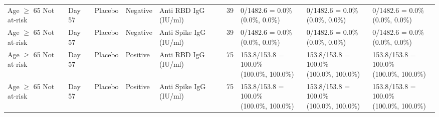 \documentclass[]{book}
\theoremstyle{definition}
\theoremstyle{definition}
\theoremstyle{definition}
\newcommand{\1}{\mathbbm{1}}
\begin{document}
\begin{landscape}
\begin{ThreePartTable}
\begin{longtable}[t]{>{\raggedright\arraybackslash}p{2.7cm}llllllll}
\hspace{1em}Age $\geq$ 65 Not at-risk & Day 57 & Placebo & Negative & Anti RBD IgG (IU/ml) & 39 & \makecell[l]{0/1482.6 = 0.0\%\\(0.0\%, 0.0\%)} & \makecell[l]{0/1482.6 = 0.0\%\\(0.0\%, 0.0\%)} & \makecell[l]{0/1482.6 = 0.0\%\\(0.0\%, 0.0\%)}\\
\hspace{1em}Age $\geq$ 65 Not at-risk & Day 57 & Placebo & Negative & Anti Spike IgG (IU/ml) & 39 & \makecell[l]{0/1482.6 = 0.0\%\\(0.0\%, 0.0\%)} & \makecell[l]{0/1482.6 = 0.0\%\\(0.0\%, 0.0\%)} & \makecell[l]{0/1482.6 = 0.0\%\\(0.0\%, 0.0\%)}\\
\hspace{1em}Age $\geq$ 65 Not at-risk & Day 57 & Placebo & Positive & Anti RBD IgG (IU/ml) & 75 & \makecell[l]{153.8/153.8 = 100.0\%\\(100.0\%, 100.0\%)} & \makecell[l]{153.8/153.8 = 100.0\%\\(100.0\%, 100.0\%)} & \makecell[l]{153.8/153.8 = 100.0\%\\(100.0\%, 100.0\%)}\\
\hspace{1em}Age $\geq$ 65 Not at-risk & Day 57 & Placebo & Positive & Anti Spike IgG (IU/ml) & 75 & \makecell[l]{153.8/153.8 = 100.0\%\\(100.0\%, 100.0\%)} & \makecell[l]{153.8/153.8 = 100.0\%\\(100.0\%, 100.0\%)} & \makecell[l]{153.8/153.8 = 100.0\%\\(100.0\%, 100.0\%)}\\*
\end{longtable}
\end{ThreePartTable}


\clearpage


\end{landscape}
\end{document}
